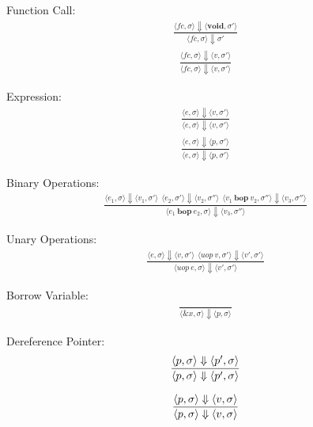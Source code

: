 \documentclass[12pt]{article}
\begin{document}
	Function Call:
	\begin{align*}
		\frac{\langle fc, \sigma \rangle\Downarrow \langle \textbf{void}, \sigma' \rangle}
		{\langle fc, \sigma \rangle\Downarrow \sigma'}
	\end{align*}
	\begin{align*}
		\frac{\langle fc, \sigma \rangle\Downarrow \langle v, \sigma' \rangle}
		{\langle fc, \sigma \rangle\Downarrow \langle v, \sigma' \rangle}
	\end{align*}

	Expression:
	\begin{align*}
		\frac{\langle e, \sigma \rangle\Downarrow \langle v, \sigma' \rangle}
		{\langle e, \sigma \rangle\Downarrow \langle v, \sigma' \rangle}
	\end{align*}
	\begin{align*}
		\frac{\langle e, \sigma \rangle\Downarrow \langle p, \sigma' \rangle}
		{\langle e, \sigma \rangle\Downarrow \langle p, \sigma' \rangle}
	\end{align*}

	Binary Operations:
	\begin{align*}
		\frac{\langle e_1, \sigma \rangle\Downarrow \langle v_1, \sigma' \rangle \ \
		\langle e_2, \sigma' \rangle\Downarrow \langle v_2, \sigma'' \rangle \ \
		\langle v_1\ \textbf{bop}\ v_2, \sigma'' \rangle\Downarrow \langle v_3, \sigma'' \rangle}
		{\langle e_1\ \textbf{bop}\ e_2, \sigma \rangle\Downarrow \langle v_3, \sigma'' \rangle}
	\end{align*}
	
	Unary Operations:
	\begin{align*}
		\frac{\langle e, \sigma \rangle\Downarrow \langle v, \sigma' \rangle \ \
		\langle uop\ v, \sigma' \rangle\Downarrow \langle v', \sigma' \rangle}
		{\langle uop\ e, \sigma \rangle\Downarrow \langle v', \sigma' \rangle}
	\end{align*}

	Borrow Variable:
	\begin{align*}
		\frac{}
		{\langle \&x, \sigma \rangle\Downarrow \langle p, \sigma \rangle}
	\end{align*}

	Dereference Pointer:
	\begin{align*}
		\frac{\langle \*p, \sigma \rangle\Downarrow \langle p', \sigma \rangle}
		{\langle \*p, \sigma \rangle\Downarrow \langle p', \sigma \rangle}
	\end{align*}

	\begin{align*}
		\frac{\langle \*p, \sigma \rangle\Downarrow \langle v, \sigma \rangle}
		{\langle \*p, \sigma \rangle\Downarrow \langle v, \sigma \rangle}
	\end{align*}	
\end{document}
